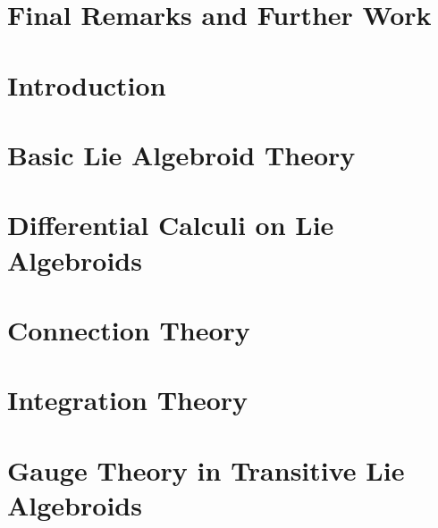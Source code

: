 \documentclass[12pt]{report}
\theoremstyle{definition}
\begin{document}
\chapter*{Final Remarks and Further Work}
 \label{chp:remarks}

\setcounter{chapter}{-1}
\chapter{Introduction}\label{chp:intro}


\chapter{Basic Lie Algebroid Theory}\label{chp:basicLie}


\chapter{Differential Calculi on Lie Algebroids}\label{chp:diffStruc}


\chapter{Connection Theory}\label{chp:connections}


\chapter{Integration Theory}\label{chp:integration}


\chapter{Gauge Theory in Transitive Lie Algebroids}\label{chp:gaugeTh}


\printbibliography
\end{document}
